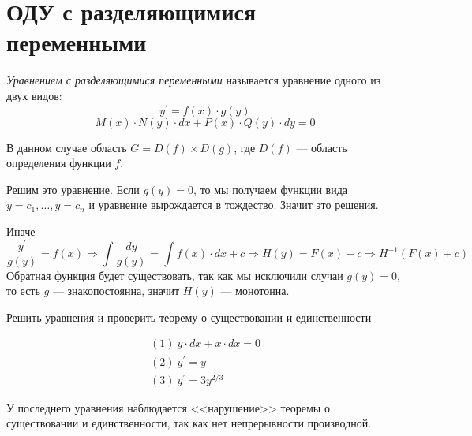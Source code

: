 \section{ОДУ с разделяющимися переменными}
\begin{define*}
\emph{Уравнением с разделяющимися переменными} называется уравнение
одного из двух видов: 
\[
y^{\prime}=f(x)\cdot g(y)
\]
\[
M(x)\cdot N(y)\cdot dx+P(x)\cdot Q(y)\cdot dy=0
\]
\end{define*}
\begin{remark*}
В данном случае область $G=D(f)\times D(g)$, где $D(f)$ --- область
определения функции $f$.\end{remark*}
\begin{algorithm*}
Решим это уравнение. Если $g(y)=0$, то мы получаем функции вида $y=c_{1},\ldots,y=c_{n}$
и уравнение вырождается в тождество. Значит это решения.

Иначе 
\[
\frac{y^{\prime}}{g(y)}=f(x)\Rightarrow\int\frac{dy}{g(y)}=\int f(x)\cdot dx+c\Rightarrow H(y)=F(x)+c\Rightarrow H^{-1}(F(x)+c)
\]
Обратная функция будет существовать, так как мы исключили случаи $g(y)=0$,
то есть $g$ --- знакопостоянна, значит $H(y)$ --- монотонна.\end{algorithm*}
\begin{exercise}
Решить уравнения и проверить теорему о существовании и единственности

\begin{gather*}
(1)\ y\cdot dx+x\cdot dx=0\\
(2)\ y^{\prime}=y\\
(3)\ y^{\prime}=3y^{2/3}
\end{gather*}
\end{exercise}
\begin{remark*}
У последнего уравнения наблюдается <<нарушение>> теоремы о существовании
и единственности, так как нет непрерывности производной.\end{remark*}




